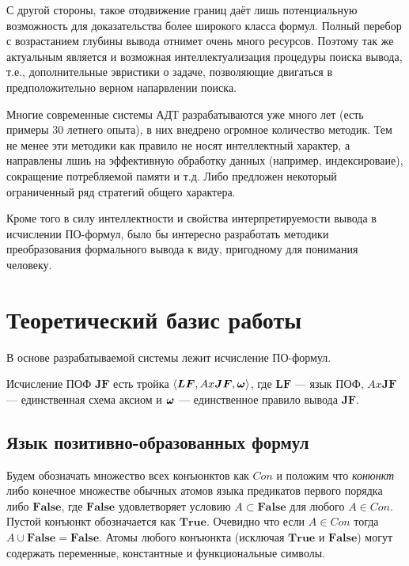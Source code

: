С другой стороны, такое отодвижение границ даёт лишь потенциальную возможность для доказательства более широкого класса формул. Полный перебор с возрастанием глубины вывода отнимет очень много ресурсов. Поэтому так же актуальным является и возможная интеллектуализация процедуры поиска вывода, т.е., дополнительные эвристики о задаче, позволяющие двигаться в предположительно верном напарвлении поиска. 

Многие современные системы АДТ разрабатываются уже много лет (есть примеры 30 летнего опыта), в них внедрено огромное количество методик. Тем не менее эти методики как правило не носят интеллектный характер, а направлены лшиь на эффективную обработку данных (например, индексироваие), сокращение потребляемой памяти и т.д. Либо предложен некоторый ограниченный ряд стратегий общего характера.

Кроме того в силу интеллектности и свойства интерпретируемости вывода в исчислении ПО-формул, было бы интересно разработать методики преобразования формального вывода к виду, пригодному для понимания человеку.



\section{Теоретический базис работы}

В основе разрабатываемой системы лежит исчисление ПО-формул.


Исчисление ПОФ $\boldsymbol{JF}$ есть тройка $\left\langle \boldsymbol{LF}, Ax\boldsymbol{JF}, \boldsymbol{\omega} \right\rangle$, где $\boldsymbol{LF}$ --- язык ПОФ, $Ax\boldsymbol{JF}$ --- единственная схема аксиом и $\boldsymbol{\omega}$ --- единственное правило вывода $\boldsymbol{JF}.$
 
\subsection{Язык позитивно-образованных формул}

Будем обозначать множество всех конъюнктов как $Con$ и положим что {\em конюнкт} либо конечное множестве обычных атомов языка предикатов первого порядка либо $\boldsymbol{False}$, где $\boldsymbol{False}$ удовлетворяет условию $A \subset \boldsymbol{False} $ для любого $A \in Con$. Пустой конъюнкт обозначается как $\boldsymbol{True}$. Очевидно что если $A \in Con$ тогда $A \cup \boldsymbol{False} = \boldsymbol{False}$. Атомы любого конъюнкта (исключая $\boldsymbol{True}$ и $\boldsymbol{False}$) могут содержать переменные, константные и функциональные символы. 

